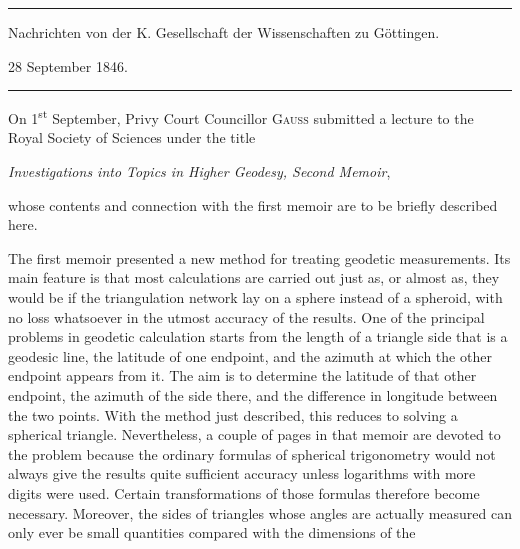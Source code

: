 \begin{center}
\rule{.85\textwidth}{.3pt}\par
Nachrichten von der K. Gesellschaft der Wissenschaften zu Göttingen.\par 28 September 1846.\par
\rule{.85\textwidth}{.3pt}
\end{center}
\hspace*{\parindent}On 1\textsuperscript{st} September, Privy Court Councillor \textsc{Gauss} submitted a lecture to the Royal Society of Sciences under the title
\begin{center}\textit{Investigations into Topics in Higher Geodesy, Second Memoir},\end{center}
\noindent whose contents and connection with the first memoir are to be briefly described here.

The first memoir presented a new method for treating geodetic measurements. Its main feature is that most calculations are carried out just as, or almost as, they would be if the triangulation network lay on a sphere instead of a spheroid, with no loss whatsoever in the utmost accuracy of the results. One of the principal problems in geodetic calculation starts from the length of a triangle side that is a geodesic line, the latitude of one endpoint, and the azimuth at which the other endpoint appears from it. The aim is to determine the latitude of that other endpoint, the azimuth of the side there, and the difference in longitude between the two points. With the method just described, this reduces to solving a spherical triangle. Nevertheless, a couple of pages in that memoir are devoted to the problem because the ordinary formulas of spherical trigonometry would not always give the results quite sufficient accuracy unless logarithms with more digits were used. Certain transformations of those formulas therefore become necessary. Moreover, the sides of triangles whose angles are actually measured can only ever be small quantities compared with the dimensions of the %
